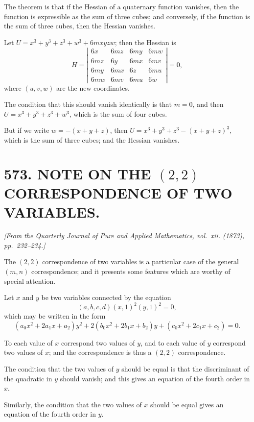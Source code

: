 \documentclass[11pt,a4paper]{article}
\theoremstyle{plain}
\theoremstyle{definition}
\theoremstyle{remark}
\newcommand{\paper}[2]{\section*{#1 #2}}
\newcommand{\papersource}[1]{\par\noindent\textit{#1}\par\medskip}
\begin{document}
\newpage

The theorem is that if the Hessian of a quaternary function vanishes, then the function is expressible as the sum of three cubes; and conversely, if the function is the sum of three cubes, then the Hessian vanishes.

Let $U = x^3 + y^3 + z^3 + w^3 + 6mxyzw$; then the Hessian is
\[
H = \left| \begin{array}{cccc}
6x & 6mz & 6my & 6mw \\
6mz & 6y & 6mx & 6mv \\
6my & 6mx & 6z & 6mu \\
6mw & 6mv & 6mu & 6w
\end{array} \right| = 0,
\]
where $(u, v, w)$ are the new coordinates.

The condition that this should vanish identically is that $m = 0$, and then $U = x^3 + y^3 + z^3 + w^3$, which is the sum of four cubes.

But if we write $w = -(x + y + z)$, then $U = x^3 + y^3 + z^3 - (x + y + z)^3$, which is the sum of three cubes; and the Hessian vanishes.

\newpage
\paper{573.}{NOTE ON THE $(2,2)$ CORRESPONDENCE OF TWO VARIABLES.}

\papersource{[From the Quarterly Journal of Pure and Applied Mathematics, vol.~xii. (1873), pp.~232--234.]}

The $(2,2)$ correspondence of two variables is a particular case of the general $(m,n)$ correspondence; and it presents some features which are worthy of special attention.

Let $x$ and $y$ be two variables connected by the equation
\[
(a, b, c, d)(x, 1)^2(y, 1)^2 = 0,
\]
which may be written in the form
\[
(a_0x^2 + 2a_1x + a_2)y^2 + 2(b_0x^2 + 2b_1x + b_2)y + (c_0x^2 + 2c_1x + c_2) = 0.
\]

To each value of $x$ correspond two values of $y$, and to each value of $y$ correspond two values of $x$; and the correspondence is thus a $(2,2)$ correspondence.

The condition that the two values of $y$ should be equal is that the discriminant of the quadratic in $y$ should vanish; and this gives an equation of the fourth order in $x$.

\newpage

Similarly, the condition that the two values of $x$ should be equal gives an equation of the fourth order in $y$.
\end{document}
